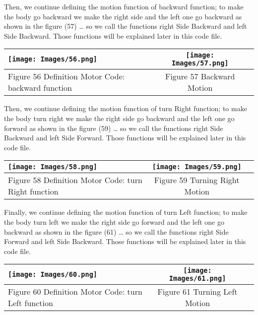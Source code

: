 \documentclass{article}
\begin{document}
Then, we continue defining the motion function of backward function; to make the body go backward we make the right side and the left one go backward as shown in the figure (57) … so we call the functions right Side Backward and left Side Backward. Those functions will be explained later in this code file.

\begin{center}
\begin{tabular}{|l|c|r|}
    \hline
    \texttt{[image: Images/56.png]} &  \texttt{[image: Images/57.png]}\\
    \hline
    Figure 56 Definition Motor Code: backward function & Figure 57 Backward Motion\\
    \hline
\end{tabular}
\end{center}

Then, we continue defining the motion function of turn Right function; to make the body turn right we make the right side go backward and the left one go forward as shown in the figure (59) … so we call the functions right Side Backward and left Side Forward. Those functions will be explained later in this code file.

\begin{center}
\begin{tabular}{|l|c|r|}
    \hline
    \texttt{[image: Images/58.png]} &  \texttt{[image: Images/59.png]}\\
    \hline
    Figure 58 Definition Motor Code: turn Right function & Figure 59 Turning Right Motion\\
    \hline
\end{tabular}
\end{center}

Finally, we continue defining the motion function of turn Left function; to make the body turn left we make the right side go forward and the left one go backward as shown in the figure (61) … so we call the functions right Side Forward and left Side Backward. Those functions will be explained later in this code file.

\begin{center}
\begin{tabular}{|l|c|r|}
    \hline
    \texttt{[image: Images/60.png]} &  \texttt{[image: Images/61.png]}\\
    \hline
    Figure 60 Definition Motor Code: turn Left function & Figure 61 Turning Left Motion\\
    \hline
\end{tabular}
\end{center}
\end{document}
